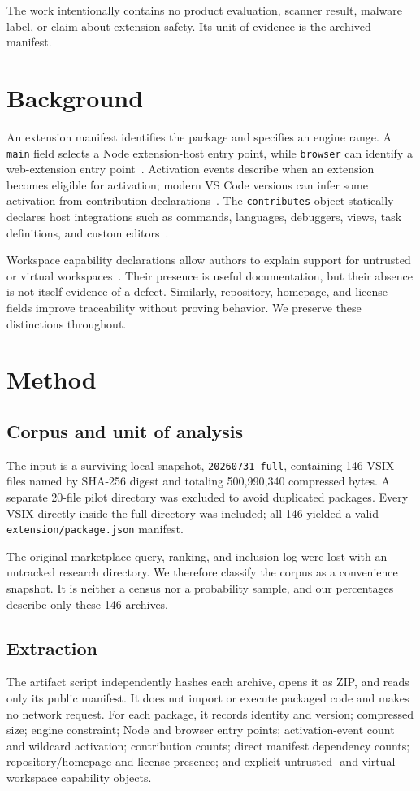 \documentclass[10pt,twocolumn]{article}
\begin{document}
The work intentionally contains no product evaluation, scanner result, malware label, or claim about extension safety. Its unit of evidence is the archived manifest.

\section{Background}
An extension manifest identifies the package and specifies an engine range. A \texttt{main} field selects a Node extension-host entry point, while \texttt{browser} can identify a web-extension entry point~\cite{vscode-anatomy,vscode-web}. Activation events describe when an extension becomes eligible for activation; modern VS Code versions can infer some activation from contribution declarations~\cite{vscode-activation}. The \texttt{contributes} object statically declares host integrations such as commands, languages, debuggers, views, task definitions, and custom editors~\cite{vscode-contribution}.

Workspace capability declarations allow authors to explain support for untrusted or virtual workspaces~\cite{vscode-capabilities,vscode-trust}. Their presence is useful documentation, but their absence is not itself evidence of a defect. Similarly, repository, homepage, and license fields improve traceability without proving behavior. We preserve these distinctions throughout.

\section{Method}
\subsection{Corpus and unit of analysis}
The input is a surviving local snapshot, \texttt{20260731-full}, containing 146 VSIX files named by SHA-256 digest and totaling 500,990,340 compressed bytes. A separate 20-file pilot directory was excluded to avoid duplicated packages. Every VSIX directly inside the full directory was included; all 146 yielded a valid \texttt{extension/package.json} manifest.

The original marketplace query, ranking, and inclusion log were lost with an untracked research directory. We therefore classify the corpus as a convenience snapshot. It is neither a census nor a probability sample, and our percentages describe only these 146 archives.

\subsection{Extraction}
The artifact script independently hashes each archive, opens it as ZIP, and reads only its public manifest. It does not import or execute packaged code and makes no network request. For each package, it records identity and version; compressed size; engine constraint; Node and browser entry points; activation-event count and wildcard activation; contribution counts; direct manifest dependency counts; repository/homepage and license presence; and explicit untrusted- and virtual-workspace capability objects.
\end{document}
